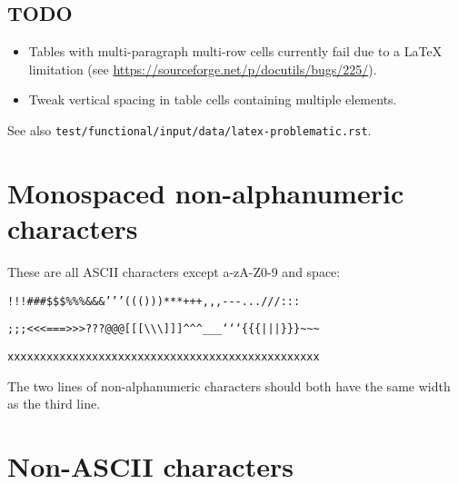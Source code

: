\documentclass[a4paper]{article}
\begin{document}
\subsection{TODO%
  \label{todo}%
}

\begin{itemize}
\item Tables with multi-paragraph multi-row cells currently fail due to a
LaTeX limitation (see \url{https://sourceforge.net/p/docutils/bugs/225/}).

\item Tweak vertical spacing in table cells containing multiple elements.
\end{itemize}

See also \texttt{test/functional/input/data/latex-problematic.rst}.


\section{Monospaced non-alphanumeric characters%
  \label{monospaced-non-alphanumeric-characters}%
}

These are all ASCII characters except a-zA-Z0-9 and space:

\texttt{!!!\textquotedbl{}\textquotedbl{}\textquotedbl{}\#\#\#\$\$\$\%\%\%\&\&\&'{}'{}'((()))***+++,{},{},-{}-{}-...///:::}

\texttt{;;;<{}<{}<===>{}>{}>???@@@{[}{[}{[}\textbackslash{}\textbackslash{}\textbackslash{}{]}{]}{]}\textasciicircum{}\textasciicircum{}\textasciicircum{}\_\_\_`{}`{}`\{\{\{|||\}\}\}\textasciitilde{}\textasciitilde{}\textasciitilde{}}

\texttt{xxxxxxxxxxxxxxxxxxxxxxxxxxxxxxxxxxxxxxxxxxxxxxxx}

The two lines of non-alphanumeric characters should both have the same
width as the third line.


\section{Non-ASCII characters%
  \label{non-ascii-characters}%
}
\end{document}
